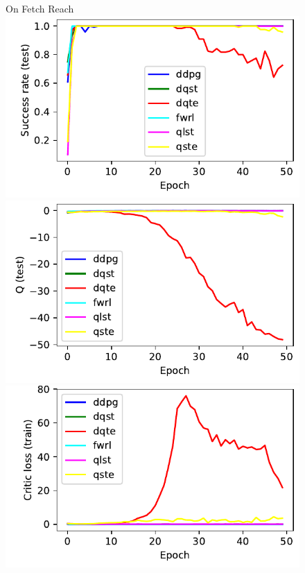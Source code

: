\begin{figure}
  On Fetch Reach\\
  \includegraphics[width=\frac\columnwidth]{media/res/38f4625-FetchReach-v1-fwrl-future/test/success_rate.pdf}%
  \includegraphics[width=\frac\columnwidth]{media/res/38f4625-FetchReach-v1-fwrl-future/test/mean_Q.pdf}%
  \includegraphics[width=\frac\columnwidth]{media/res/38f4625-FetchReach-v1-fwrl-future/train/critic_loss.pdf}\\

\end{figure}
